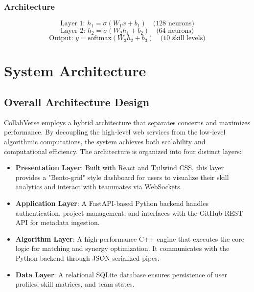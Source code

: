 \documentclass[12pt,a4paper]{article}
\begin{document}
\subsubsection{Architecture}
\[
\text{Layer 1: } h_1 = \sigma(W_1 x + b_1) \quad \text{(128 neurons)}
\]
\[
\text{Layer 2: } h_2 = \sigma(W_2 h_1 + b_2) \quad \text{(64 neurons)}
\]
\[
\text{Output: } y = \text{softmax}(W_3 h_2 + b_3) \quad \text{(10 skill levels)}
\]

\section{System Architecture}

\subsection{Overall Architecture Design}
CollabVerse employs a hybrid architecture that separates concerns and maximizes performance. By decoupling the high-level web services from the low-level algorithmic computations, the system achieves both scalability and computational efficiency. The architecture is organized into four distinct layers:

\begin{itemize}
    \item \textbf{Presentation Layer}: Built with React and Tailwind CSS, this layer provides a "Bento-grid" style dashboard for users to visualize their skill analytics and interact with teammates via WebSockets.
    \item \textbf{Application Layer}: A FastAPI-based Python backend handles authentication, project management, and interfaces with the GitHub REST API for metadata ingestion.
    \item \textbf{Algorithm Layer}: A high-performance C++ engine that executes the core logic for matching and synergy optimization. It communicates with the Python backend through JSON-serialized pipes.
    \item \textbf{Data Layer}: A relational SQLite database ensures persistence of user profiles, skill matrices, and team states.
\end{itemize}
\end{document}
